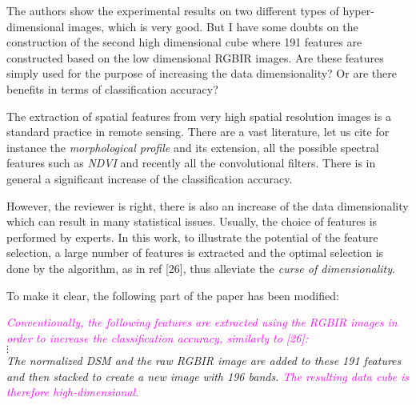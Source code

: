 \documentclass[a4paper,10pt,DIV=16]{scrartcl}
\newcommand{\rev}[1]{\textcolor{magenta}{#1}}
\begin{document}
\begin{revbox}
  The authors show the experimental results on two different types of hyper-dimensional images, which is very good. But I have some doubts on the construction of the second high dimensional cube where 191 features are constructed based on the low dimensional RGBIR images. Are these features simply used for the purpose of increasing the data dimensionality? Or are there benefits in terms of classification accuracy?
  \begin{resbox}
    The extraction of spatial features from very high spatial resolution images is a standard practice in remote sensing. There are a vast literature, let us cite for instance the \emph{morphological profile} and its extension, all the possible spectral features such as \emph{NDVI} and recently all the convolutional filters. There is in general a significant increase of the classification accuracy.

    However, the reviewer is right, there is also an increase of the data dimensionality which can result in many statistical issues. Usually, the choice of features is performed by experts. In this work, to illustrate the potential of the feature selection, a large number of features is extracted and the optimal selection is done by the algorithm, as in ref [26], thus alleviate the \emph{curse of dimensionality}.

    To make it clear, the following part of the paper has been modified:

    \emph{\rev{Conventionally,  the following  features are  extracted using  the
      RGBIR  images in  order to  increase the  classification accuracy,
      similarly to [26]:}\\
    $\vdots$\\    
    The normalized DSM and the raw  RGBIR image are added to these 191
    features and  then stacked to create  a new image with  196 bands.
    \rev{The  resulting  data cube  is  therefore  high-dimensional.}}
    
  \end{resbox}
\end{revbox}
\end{document}
